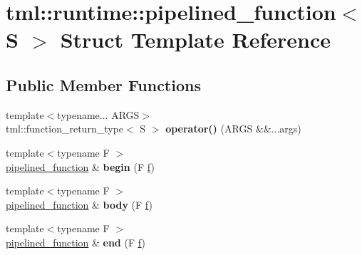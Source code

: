 \hypertarget{structtml_1_1runtime_1_1pipelined__function}{\section{tml\+:\+:runtime\+:\+:pipelined\+\_\+function$<$ S $>$ Struct Template Reference}
\label{structtml_1_1runtime_1_1pipelined__function}
}
\subsection*{Public Member Functions}
\begin{DoxyCompactItemize}
\item 
\hypertarget{structtml_1_1runtime_1_1pipelined__function_ae05535c5a51440c137e5120ffcd9346c}{{\footnotesize template$<$typename... A\+R\+G\+S$>$ }\\tml\+::function\+\_\+return\+\_\+type$<$ S $>$ {\bfseries operator()} (A\+R\+G\+S \&\&...args)}\label{structtml_1_1runtime_1_1pipelined__function_ae05535c5a51440c137e5120ffcd9346c}

\item 
\hypertarget{structtml_1_1runtime_1_1pipelined__function_af4fa0e88f89a1fa3800361cc5cde2712}{{\footnotesize template$<$typename F $>$ }\\\hyperlink{structtml_1_1runtime_1_1pipelined__function}{pipelined\+\_\+function} \& {\bfseries begin} (F \hyperlink{structf}{f})}\label{structtml_1_1runtime_1_1pipelined__function_af4fa0e88f89a1fa3800361cc5cde2712}

\item 
\hypertarget{structtml_1_1runtime_1_1pipelined__function_a1af710ab666b5a8e45dad01664ca38ba}{{\footnotesize template$<$typename F $>$ }\\\hyperlink{structtml_1_1runtime_1_1pipelined__function}{pipelined\+\_\+function} \& {\bfseries body} (F \hyperlink{structf}{f})}\label{structtml_1_1runtime_1_1pipelined__function_a1af710ab666b5a8e45dad01664ca38ba}

\item 
\hypertarget{structtml_1_1runtime_1_1pipelined__function_aa56ca403b77b349831e5b33d66765e91}{{\footnotesize template$<$typename F $>$ }\\\hyperlink{structtml_1_1runtime_1_1pipelined__function}{pipelined\+\_\+function} \& {\bfseries end} (F \hyperlink{structf}{f})}\label{structtml_1_1runtime_1_1pipelined__function_aa56ca403b77b349831e5b33d66765e91}


\end{DoxyCompactItemize}
